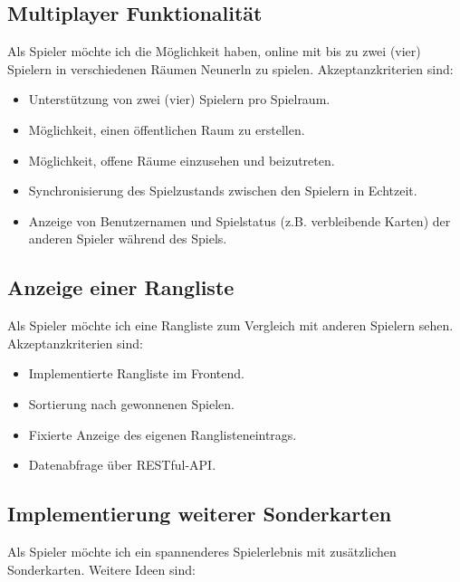 \documentclass[letterpaper, 10 pt, conference]{IEEEtran}
\begin{document}

\subsection{Multiplayer Funktionalität}

Als Spieler möchte ich die Möglichkeit haben, online mit bis zu zwei (vier) Spielern in verschiedenen Räumen Neunerln zu spielen. Akzeptanzkriterien sind:

\begin{itemize}

\item Unterstützung von zwei (vier) Spielern pro Spielraum.
\item Möglichkeit, einen öffentlichen Raum zu erstellen.
\item Möglichkeit, offene Räume einzusehen und beizutreten.
\item Synchronisierung des Spielzustands zwischen den Spielern in Echtzeit.
\item Anzeige von Benutzernamen und Spielstatus (z.B. verbleibende Karten) der anderen Spieler während des Spiels.


\end{itemize}


\subsection{Anzeige einer Rangliste}

Als Spieler möchte ich eine Rangliste zum Vergleich mit anderen Spielern sehen. Akzeptanzkriterien sind:

\begin{itemize}

\item Implementierte Rangliste im Frontend.
\item Sortierung nach gewonnenen Spielen.
\item Fixierte Anzeige des eigenen Ranglisteneintrags.
\item Datenabfrage über RESTful-API.


\end{itemize}


\subsection{Implementierung weiterer Sonderkarten}

Als Spieler möchte ich ein spannenderes Spielerlebnis mit zusätzlichen Sonderkarten. Weitere Ideen sind:
\end{document}
